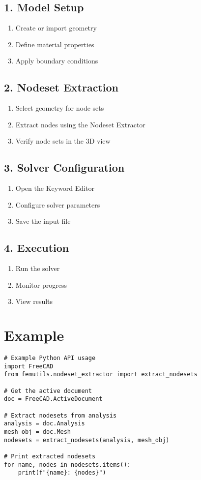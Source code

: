 \documentclass{article}
\begin{document}
\subsection{1. Model Setup}
\begin{enumerate}
    \item Create or import geometry
    \item Define material properties
    \item Apply boundary conditions
\end{enumerate}

\subsection{2. Nodeset Extraction}
\begin{enumerate}
    \item Select geometry for node sets
    \item Extract nodes using the Nodeset Extractor
    \item Verify node sets in the 3D view
\end{enumerate}

\subsection{3. Solver Configuration}
\begin{enumerate}
    \item Open the Keyword Editor
    \item Configure solver parameters
    \item Save the input file
\end{enumerate}

\subsection{4. Execution}
\begin{enumerate}
    \item Run the solver
    \item Monitor progress
    \item View results
\end{enumerate}

\section{Example}

\begin{verbatim}
# Example Python API usage
import FreeCAD
from femutils.nodeset_extractor import extract_nodesets

# Get the active document
doc = FreeCAD.ActiveDocument

# Extract nodesets from analysis
analysis = doc.Analysis
mesh_obj = doc.Mesh
nodesets = extract_nodesets(analysis, mesh_obj)

# Print extracted nodesets
for name, nodes in nodesets.items():
    print(f"{name}: {nodes}")
\end{verbatim}
\end{document}
